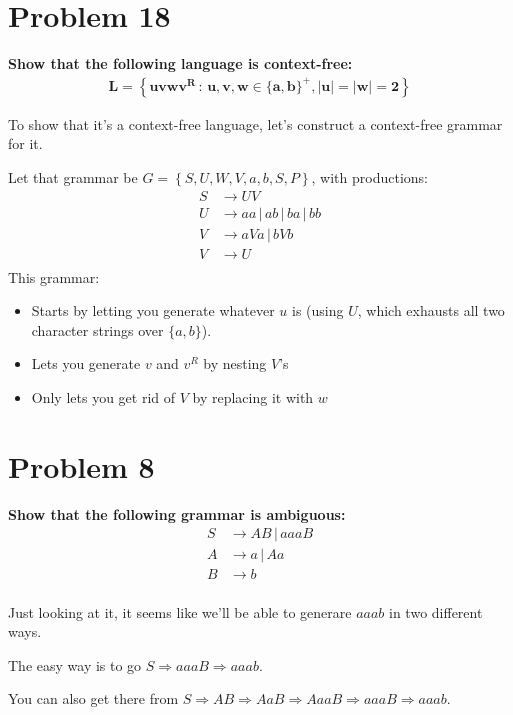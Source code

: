 \documentclass{report}
\begin{document}
\section*{ Problem 18 }

\textbf{Show that the following language is context-free:} 
\begin{gather*}
        \mathbf{L = \left\{ uvwv^R \,:\, u, v, w \in \{a, b\}^+, |u| = |w| = 2 \right\}}
\end{gather*}

To show that it's a context-free language, let's construct a context-free grammar for it.

Let that grammar be $G = \left\{ {S, U, W, V}, {a, b}, S, P \right\}$, with productions:
\begin{align*}
        S &\rightarrow UV \\
        U &\rightarrow aa \,|\, ab \,|\, ba \,|\, bb \\
        V &\rightarrow aVa \, | \, bVb\\
        V &\rightarrow U \\
\end{align*}
This grammar:
\begin{itemize}
        \item Starts by letting you generate whatever $u$ is (using $U$, which exhausts all two character strings over $\{a, b\}$).
        \item Lets you generate $v$ and $v^R$ by nesting $V$'s
        \item Only lets you get rid of $V$ by replacing it with $w$ 
\end{itemize} 


\section*{Problem 8}
\textbf{Show that the following grammar is ambiguous:}
\begin{align*}
        S &\rightarrow AB \,|\, aaaB \\
        A &\rightarrow a \,|\, Aa \\
        B &\rightarrow b \\
\end{align*}

Just looking at it, it seems like we'll be able to generare $aaab$ in two different ways.

The easy way is to go $S \Rightarrow aaaB \Rightarrow aaab$.

You can also get there from $S \Rightarrow AB \Rightarrow AaB \Rightarrow AaaB \Rightarrow aaaB \Rightarrow aaab$.
\end{document}
